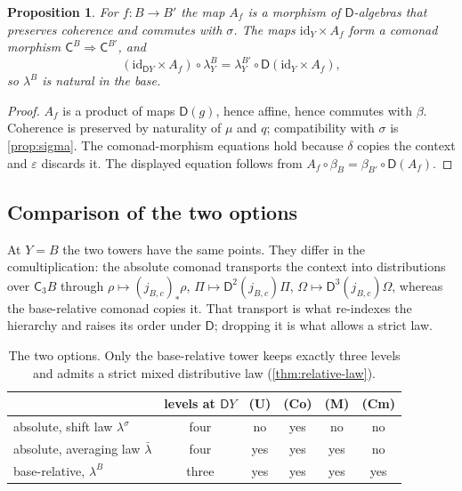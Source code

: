 \documentclass[11pt]{article}
\newtheorem{proposition}[theorem]{Proposition}
\theoremstyle{definition}
\theoremstyle{remark}
\newcommand{\D}{\mathsf{D}}
\newcommand{\C}{\mathsf{C}}
\newcommand{\id}{\mathrm{id}}
\newcommand{\lb}{\bar\lambda}
\newcommand{\ls}{\lambda^{\sigma}}
\begin{document}
\begin{proposition}\label{prop:basechange}
For $f\colon B\to B'$ the map $A_f$ is a morphism of $\D$-algebras that preserves coherence and
commutes with $\sigma$. The maps $\id_Y\times A_f$ form a comonad morphism $\C^B\Rightarrow\C^{B'}$, and
\[
(\id_{\D Y}\times A_f)\circ\lambda^B_Y=\lambda^{B'}_Y\circ\D(\id_Y\times A_f),
\]
so $\lambda^B$ is natural in the base.
\end{proposition}
\begin{proof}
$A_f$ is a product of maps $\D(g)$, hence affine, hence commutes with $\beta$. Coherence is preserved
by naturality of $\mu$ and $q$; compatibility with $\sigma$ is \cref{prop:sigma}. The comonad-morphism
equations hold because $\delta$ copies the context and $\varepsilon$ discards it. The displayed
equation follows from $A_f\circ\beta_B=\beta_{B'}\circ\D(A_f)$.
\end{proof}

\subsection{Comparison of the two options}

At $Y=B$ the two towers have the same points. They differ in the comultiplication: the absolute
comonad transports the context into distributions over $\C_3B$ through
$\rho\mapsto(j_{B,c})_*\rho$, $\Pi\mapsto\D^2(j_{B,c})\Pi$, $\Omega\mapsto\D^3(j_{B,c})\Omega$, whereas the
base-relative comonad copies it. That transport is what re-indexes the hierarchy and raises its order
under $\D$; dropping it is what allows a strict law.

\begin{table}[h]
\centering
\begin{tabular}{@{}lccccc@{}}
\toprule
& levels at $\D Y$ & (U) & (Co) & (M) & (Cm)\\
\midrule
absolute, shift law $\ls$ & four & no & yes & no & no\\
absolute, averaging law $\lb$ & four & yes & yes & yes & no\\
base-relative, $\lambda^B$ & three & yes & yes & yes & yes\\
\bottomrule
\end{tabular}
\caption{The two options. Only the base-relative tower keeps exactly three levels and admits a
strict mixed distributive law (\cref{thm:relative-law}).}
\label{tab:options}
\end{table}

\end{document}
